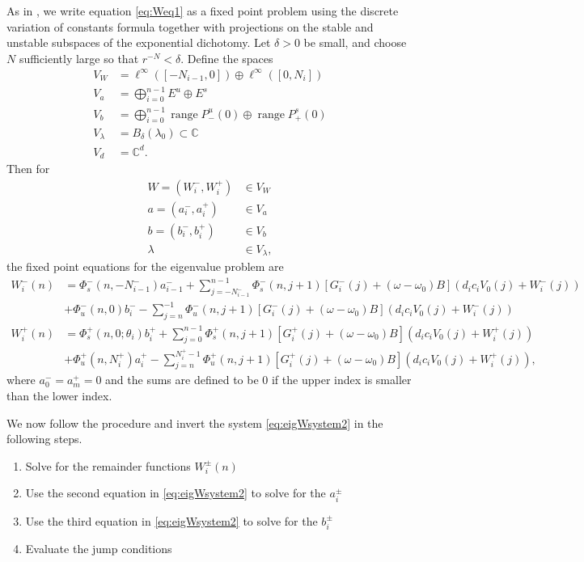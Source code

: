 \documentclass[12pt]{article}
\def\C{{\mathbb C}}
\DeclareMathOperator{\ran}{range}
\begin{document}
As in \cite{Sandstede1998}, we write equation \cref{eq:Weq1} as a fixed point problem using the discrete variation of constants formula together with projections on the stable and unstable subspaces of the exponential dichotomy. Let $\delta > 0$ be small, and choose $N$ sufficiently large so that $r^{-N} < \delta$. Define the spaces
\begin{align*}
V_W &= \ell^\infty([-N_{i-1}, 0]) \oplus \ell^\infty([0, N_i])  \\
V_a &= \bigoplus_{i=0}^{n-1} E^u \oplus E^s \\
V_b &= \bigoplus_{i=0}^{n-1} \ran P_-^u(0) \oplus \ran P_+^s(0)\\
V_\lambda &= B_\delta(\lambda_0) \subset \C \\
V_d &= \C^d.
\end{align*}
Then for
\begin{align*}
W = (W_i^-, W_i^+) &\in V_W \\
a = (a_i^-, a_i^+) &\in V_a \\
b = (b_i^-, b_i^+) &\in V_b \\
\lambda &\in V_\lambda,
\end{align*}
the fixed point equations for the eigenvalue problem are
\begin{equation}\label{fpeig}
\begin{aligned}
W_i^-(n) &= 
\Phi_s^-(n, -N_{i-1}^-) a_{i-1}^- + \sum_{j = -N_{i-1}^-}^{n-1} \Phi_s^-(n, j+1)
[G_i^-(j) + (\omega - \omega_0) B](d_i c_i V_0(j) + W_i^-(j))
 \\
&+ \Phi_u^-(n, 0) b_i^- - \sum_{j = n}^{-1} \Phi_u^-(n, j+1) 
[G_i^-(j) + (\omega - \omega_0) B](d_i c_i V_0(j) + W_i^-(j))\\
W_i^+(n) &= \Phi_s^+(n, 0; \theta_i) b_i^+ + \sum_{j = 0}^{n-1} \Phi_s^+(n, j+1) 
[G_i^+(j) + (\omega - \omega_0) B](d_i c_i V_0(j) + W_i^+(j))\\
&+ \Phi_u^+(n, N_i^+) a_i^+ - \sum_{j = n}^{N_i^+-1} \Phi_u^+(n, j+1) 
[G_i^+(j) + (\omega - \omega_0) B](d_i c_i V_0(j) + W_i^+(j)),
\end{aligned}
\end{equation}
where $a_0^- = a_m^+ = 0$ and the sums are defined to be $0$ if the upper index is smaller than the lower index.

We now follow the procedure and invert the system \cref{eq:eigWsystem2} in the following steps.

\begin{enumerate}
\item Solve for the remainder functions $W_i^\pm(n)$
\item Use the second equation in \cref{eq:eigWsystem2} to solve for the $a_i^\pm$
\item Use the third equation in \cref{eq:eigWsystem2} to solve for the $b_i^\pm$
\item Evaluate the jump conditions
\end{enumerate}
\end{document}
